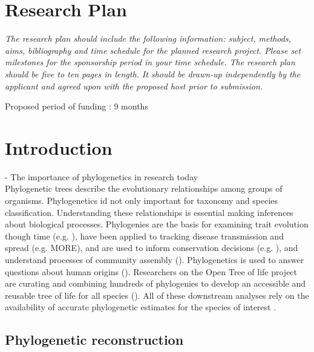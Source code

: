\documentclass[10pt]{article}
\begin{document}
\section*{Research Plan}                   

\textsl{The research plan should include the following information: subject, methods, aims, bibliography and time schedule for the planned research project. 
Please set milestones for the sponsorship period in your time schedule.
The research plan should be five to ten pages in length.
It should be drawn-up independently by the applicant and agreed upon with the proposed host prior to submission.}

Proposed period of funding : 9 months


\hline
\section*{Introduction}
  - The importance of phylogenetics in research today\\
Phylogenetic trees describe the evolutionary relationships among groups of organisms. 
Phylogenetics id not only important for taxonomy and species classification. 
Understanding these relationships is essential making inferences about biological processes. 
Phylogenies are the basis for examining trait evolution though time (e.g. 
\cite{omeara_testing_2006}), have been applied to tracking disease transmission and spread (e.g. 
\cite{timme_phylogenetic_2013} MORE), and are used to inform conservation decisions (e.g. 
\cite{isaac_mammals_2007}), and understand processes of community assembly (\cite{emerson_phylogenetic_2008}). 
Phylogenetics is used to answer questions about human origins (\cite{endicott_using_2010}). 
Researchers on the Open Tree of life project are curating and combining hundreds of phylogenies to develop an accessible and reusable tree of life for all species (\cite{drew_lost_2013}). 
All of these downstream analyses rely on the availability of accurate phylogenetic estimates for the species of interest \cite{stoltzfus_phylotastic!_2013}.


\subsection*{Phylogenetic reconstruction}
\end{document}
